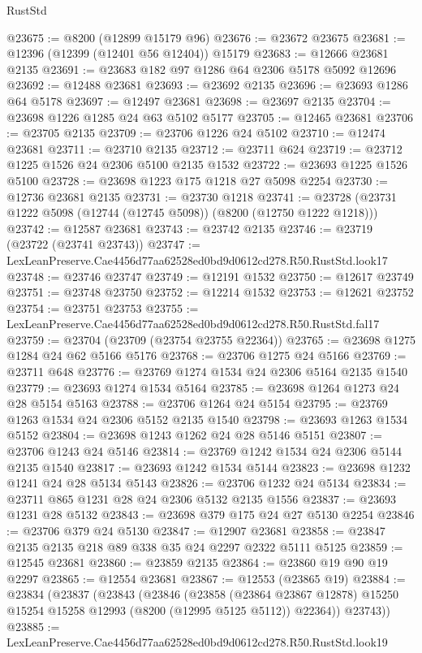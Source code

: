 \begin{lexlean}{RustStd}
\begin{coremodule}
@23675 := @8200 (@12899 @15179 @96)
@23676 := @23672 @23675
@23681 := @12396 (@12399 (@12401 @56 @12404)) @15179
@23683 := @12666 @23681 @2135
@23691 := @23683 @182 @97 @1286 @64 @2306 @5178 @5092 @12696
@23692 := @12488 @23681
@23693 := @23692 @2135
@23696 := @23693 @1286 @64 @5178
@23697 := @12497 @23681
@23698 := @23697 @2135
@23704 := @23698 @1226 @1285 @24 @63 @5102 @5177
@23705 := @12465 @23681
@23706 := @23705 @2135
@23709 := @23706 @1226 @24 @5102
@23710 := @12474 @23681
@23711 := @23710 @2135
@23712 := @23711 @624
@23719 := @23712 @1225 @1526 @24 @2306 @5100 @2135 @1532
@23722 := @23693 @1225 @1526 @5100
@23728 := @23698 @1223 @175 @1218 @27 @5098 @2254
@23730 := @12736 @23681 @2135
@23731 := @23730 @1218
@23741 := @23728 (@23731 @1222 @5098 (@12744 (@12745 @5098)) (@8200 (@12750 @1222 @1218)))
@23742 := @12587 @23681
@23743 := @23742 @2135
@23746 := @23719 (@23722 (@23741 @23743))
@23747 := LexLeanPreserve.Cae4456d77aa62528ed0bd9d0612cd278.R50.RustStd.look17
@23748 := @23746 @23747
@23749 := @12191 @1532
@23750 := @12617 @23749
@23751 := @23748 @23750
@23752 := @12214 @1532
@23753 := @12621 @23752
@23754 := @23751 @23753
@23755 := LexLeanPreserve.Cae4456d77aa62528ed0bd9d0612cd278.R50.RustStd.fal17
@23759 := @23704 (@23709 (@23754 @23755 @22364))
@23765 := @23698 @1275 @1284 @24 @62 @5166 @5176
@23768 := @23706 @1275 @24 @5166
@23769 := @23711 @648
@23776 := @23769 @1274 @1534 @24 @2306 @5164 @2135 @1540
@23779 := @23693 @1274 @1534 @5164
@23785 := @23698 @1264 @1273 @24 @28 @5154 @5163
@23788 := @23706 @1264 @24 @5154
@23795 := @23769 @1263 @1534 @24 @2306 @5152 @2135 @1540
@23798 := @23693 @1263 @1534 @5152
@23804 := @23698 @1243 @1262 @24 @28 @5146 @5151
@23807 := @23706 @1243 @24 @5146
@23814 := @23769 @1242 @1534 @24 @2306 @5144 @2135 @1540
@23817 := @23693 @1242 @1534 @5144
@23823 := @23698 @1232 @1241 @24 @28 @5134 @5143
@23826 := @23706 @1232 @24 @5134
@23834 := @23711 @865 @1231 @28 @24 @2306 @5132 @2135 @1556
@23837 := @23693 @1231 @28 @5132
@23843 := @23698 @379 @175 @24 @27 @5130 @2254
@23846 := @23706 @379 @24 @5130
@23847 := @12907 @23681
@23858 := @23847 @2135 @2135 @218 @89 @338 @35 @24 @2297 @2322 @5111 @5125
@23859 := @12545 @23681
@23860 := @23859 @2135
@23864 := @23860 @19 @90 @19 @2297
@23865 := @12554 @23681
@23867 := @12553 (@23865 @19)
@23884 := @23834
    (@23837
      (@23843
        (@23846
          (@23858
            (@23864 @23867 @12878)
            @15250
            @15254
            @15258
            @12993
            (@8200 (@12995 @5125 @5112))
            @22364))
        @23743))
@23885 := LexLeanPreserve.Cae4456d77aa62528ed0bd9d0612cd278.R50.RustStd.look19

\end{coremodule}
\end{lexlean}
